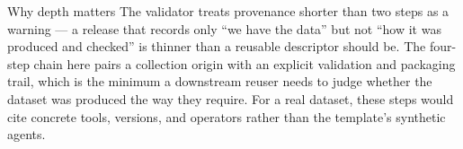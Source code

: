 \documentclass[
  ignorenonframetext,
]{beamer}
\begin{document}
\begin{frame}[allowframebreaks]{Why depth matters}
\protect{}\label{why-depth-matters}
The validator treats provenance shorter than two steps as a warning ---
a release that records only ``we have the data'' but not ``how it was
produced and checked'' is thinner than a reusable descriptor should be.
The four-step chain here pairs a collection origin with an explicit
validation and packaging trail, which is the minimum a downstream reuser
needs to judge whether the dataset was produced the way they require.
For a real dataset, these steps would cite concrete tools, versions, and
operators rather than the template's synthetic agents.
\end{frame}
\end{document}
